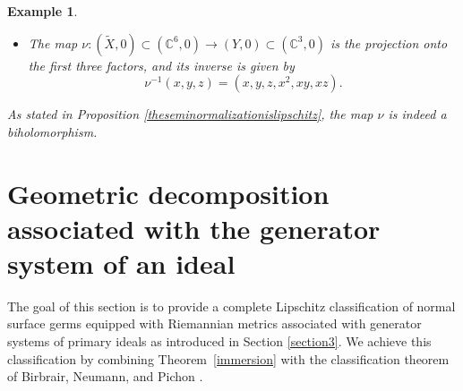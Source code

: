 \documentclass[reqno,dvipsnames,12pt]{amsart}
\newtheorem{coro}[thm]{Corollary}
\newtheorem{exam}[thm]{Example}
\begin{document}
\begin{exam}
\begin{itemize}
\begin{itemize}
    \item The map 
    $
    \nu : (\widetilde{X},0)\subset (\mathbb{C}^6,0) \longrightarrow (Y,0)\subset (\mathbb{C}^3,0)
    $
    is the projection onto the first three factors, and its inverse is given by
    $$
    \nu^{-1}(x,y,z)=(x,y,z,x^2,xy,xz).
    $$
\end{itemize}

As stated in Proposition \ref{theseminormalizationislipschitz}, the map $\nu$ is indeed a biholomorphism.


\end{itemize}
\end{exam}




\section{Geometric decomposition associated with the generator system of an ideal}\label{section5}

The goal of this section is to provide a complete Lipschitz classification of normal surface germs equipped with  Riemannian metrics associated with generator systems of primary ideals as  introduced in Section \ref{section3}. We achieve this classification by combining Theorem~\ref{immersion} with the classification theorem of Birbrair, Neumann, and Pichon \cite{BNP}. 
\end{document}
